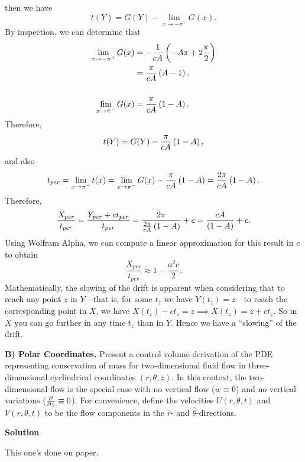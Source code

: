 \documentclass{article}
\begin{document}
%
then we have
%
\begin{equation*}
    t(Y) = G(Y) - \lim_{x \to -\pi^+} G(x)
    .
\end{equation*}
%
By inspection, we can determine that
%
\begin{align*}
    \lim_{x \to - \pi^+} G(x)
        &= - \frac{1}{c A} \del{- A \pi + 2 \frac{\pi}{2}} \\
        &= \frac{\pi}{c A} \del{A - 1}, \\ \\
    \lim_{x \to \pi^-} G(x)
        &= \frac{\pi}{c A} \del{1 - A}.
\end{align*}
%
Therefore,
%
\begin{equation*}
    t(Y) = G(Y) - \frac{\pi}{c A} \del{1 - A}
    ,
\end{equation*}
%
and also
%
\begin{equation*}
    t_{per}
        = \lim_{x \to \pi^-} t(x)
        = \lim_{x \to \pi^-} G(x) - \frac{\pi}{c A} \del{1 - A}
        = \frac{2 \pi}{c A} \del{1 - A}
    .
\end{equation*}
%
Therefore,
%
\begin{equation*}
    \frac{X_{per}}{t_{per}}
        = \frac{Y_{per} + c t_{per}}{t_{per}}
        = \frac{2 \pi}{\frac{2 \pi}{c A} \del{1 - A}} + c
        = \frac{c A}{\del{1 - A}} + c
    .
\end{equation*}
%
Using Wolfram Alpha, we can compute a linear approximation for this
result in $c$ to obtain
%
\begin{equation*}
    \frac{X_{per}}{t_{per}} \approx 1 - \frac{a^2 c}{2}
    .
\end{equation*}
%
Mathematically, the slowing of the drift is apparent when considering
that to reach any point $z$ in $Y$---that is, for some $t_z$ we have
$Y(t_z) = z$---to reach the corresponding point in $X$, we have $X(t_z)
- c t_z = z \implies X(t_z) = z + c t_z$. So in $X$ you can go further
in any time $t_z$ than in $Y$. Hence we have a ``slowing'' of the drift.


\newpage

\textbf{B) Polar Coordinates.} Present a control volume derivation of
the PDE representing conservation of mass for two-dimensional fluid flow
in three-dimensional cyclindrical coordinates $(r, \theta, z)$. In this
context, the two-dimensional flow is the special case with no vertical
flow ($w \equiv 0$) and no vertical variations ($\pd{}{z} \equiv 0$).
For convenience, define the velocities $U(r, \theta, t)$ and $V(r,
\theta, t)$ to be the flow components in the $\hat{r}$- and
$\hat{\theta}$-directions.

\textbf{Solution}

This one's done on paper.
\end{document}
